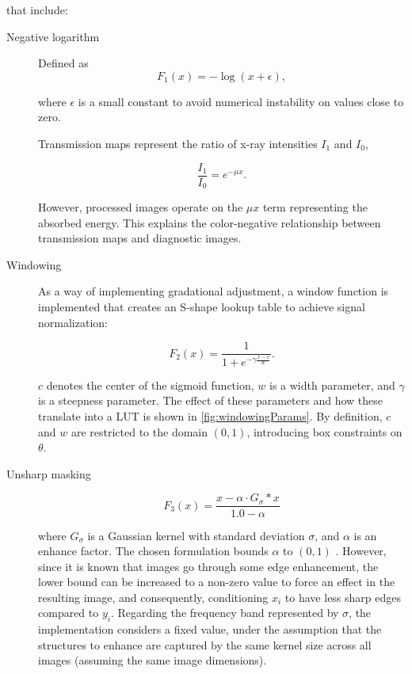 \documentclass[nomenclature, english, bibtex]{kththesis}
\numberwithin{listing}{chapter}
\begin{document}
that include:
\begin{description}

\item[Negative logarithm] Defined as
\begin{equation}
    F_{1}(x) = -\log(x + \epsilon),
\end{equation}

where $\epsilon$ is a small constant to avoid numerical instability on values close to zero.

    Transmission maps represent the ratio of x-ray intensities $I_1$ and $I_0$,

    \begin{equation}
        \frac{I_1}{I_0} = e^{-\mu x}.
    \end{equation}

    However, processed images operate on the $\mu x$ term representing the absorbed energy. This explains the color-negative
    relationship between transmission maps and diagnostic images.

\item[Windowing] As a way of implementing gradational adjustment, a window function is implemented that creates
an S-shape lookup table to achieve signal normalization:

\begin{equation}
    F_2(x) = \frac{1}{1+e^{-\gamma \frac{x - c}{w}}}.
\end{equation}

$c$ denotes the center of the sigmoid function, $w$ is a width parameter, and $\gamma$ is a steepness parameter.
The effect of these parameters and how these translate into a LUT is shown in \autoref{fig:windowingParams}.
By definition, $c$ and $w$ are restricted to the domain $(0, 1)$, introducing box constraints on
$\theta$.

\item[Unsharp masking]
\begin{equation}
    F_3(x) = \frac{x - \alpha \cdot G_\sigma * x}{1.0 - \alpha}
\end{equation}

where $G_\sigma$ is a Gaussian kernel with standard deviation $\sigma$, and $\alpha$ is an enhance factor.
The chosen formulation bounds $\alpha$ to $(0, 1)$ . However, since it is known that images go through
some edge enhancement, the lower bound can be increased to a non-zero value to force an effect
in the resulting image, and consequently, conditioning $x_i$ to have less sharp edges compared to $y_i$.
Regarding the frequency band represented by $\sigma$, the implementation considers a fixed value,
under the assumption that the structures to enhance are captured by the same kernel size across all images
(assuming the same image dimensions).

\end{description}
\end{document}
